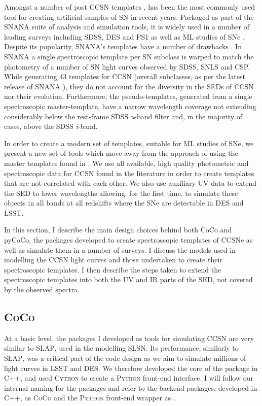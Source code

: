 Amongst a number of past CCSN templates \citep{Schlegel1995,Nugent2006}, \citet{Kessler2009} has been the most commonly used tool for creating artificial samples of SN in recent years. Packaged as part of the \textsc{SNANA} suite of analysis and simulation tools, it is widely used in a number of leading surveys including SDSS, DES and PS1 as well as ML studies of SNe \citep{Kessler2010,Lochner2016}. Despite its popularity, \textsc{SNANA}'s templates have a number of drawbacks \citep{Kessler2010}. In \textsc{SNANA} a single spectroscopic template per SN subclass \citep[Taken from]{Nugent2006} is warped to match the photometry of a number of SN light curves observed by SDSS, SNLS and CSP. While generating 43 templates for CCSN (overall subclasses, as per the latest release of \textsc{SNANA} \citep{Jones2016}), they do not account for the diversity in the SEDs of CCSN nor their evolution. Furthermore, the pseudo-templates, generated from a single spectroscopic master-template, have a narrow wavelength coverage not extending considerably below the rest-frame SDSS \textit{u}-band filter and, in the majority of cases, above the SDSS \textit{i}-band.

In order to create a modern set of templates, suitable for ML studies of SNe, we present a new set of tools which move away from the approach of using the master templates found in \citet{Nugent2006}. We use all available, high quality photometric and spectroscopic data for CCSN found in the literature in order to create templates that are not correlated with each other. We also use auxiliary UV data to extend the SED to lower wavelengths allowing, for the first time, to simulate these objects in all bands at all redshifts where the SNe are detectable in DES and LSST.

In this section, I describe the main design choices behind both CoCo and pyCoCo, the packages developed to create spectroscopic templates of CCSNe as well as simulate them in a number of surveys. I discuss the models used in modelling the CCSN light curves and those undertaken to create their spectroscopic templates. I then describe the steps taken to extend the spectroscopic templates into both the UV and IR parts of the SED, not covered by the observed spectra.

\subsection{\textsc{CoCo}}
At a basic level, the packages I developed as tools for simulating CCSN are very similar to \textsc{SLAP}, used in the modelling SLSN. Its performance, similarly to \textsc{SLAP}, was a critical part of the code design as we aim to simulate millions of light curves in LSST and DES. We therefore developed the core of the package in \textsc{C++}, and used \textsc{Cython} to create a \textsc{Python} front-end interface. I will follow our internal naming for the packages and refer to the backend packages, developed in \textsc{C++}, as \textsc{CoCo} and the \textsc{Python} front-end wrapper as .

